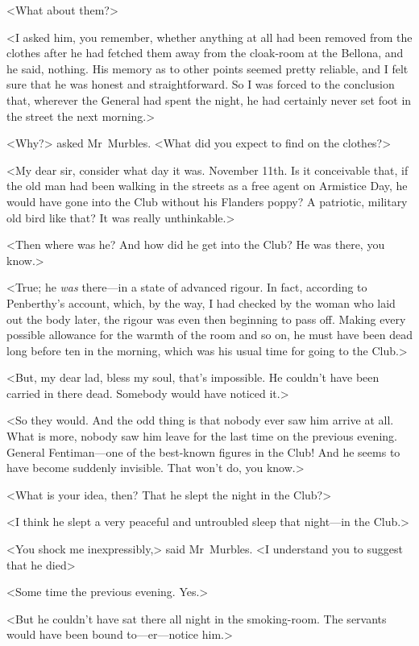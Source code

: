 <What about them?>

<I asked him, you remember, whether anything at all had been removed from the clothes after he had fetched them away from the cloak-room at the Bellona, and he said, nothing. His memory as to other points seemed pretty reliable, and I felt sure that he was honest and straightforward. So I was forced to the conclusion that, wherever the General had spent the night, he had certainly never set foot in the street the next morning.>

<Why?> asked Mr~Murbles. <What did you expect to find on the clothes?>

<My dear sir, consider what day it was. November 11th. Is it conceivable that, if the old man had been walking in the streets as a free agent on Armistice Day, he would have gone into the Club without his Flanders poppy? A patriotic, military old bird like that? It was really unthinkable.>

<Then where was he? And how did he get into the Club? He was there, you know.>

<True; he \emph{was} there—in a state of advanced rigour. In fact, according to Penberthy's account, which, by the way, I had checked by the woman who laid out the body later, the rigour was even then beginning to pass off. Making every possible allowance for the warmth of the room and so on, he must have been dead long before ten in the morning, which was his usual time for going to the Club.>

<But, my dear lad, bless my soul, that's impossible. He couldn't have been carried in there dead. Somebody would have noticed it.>

<So they would. And the odd thing is that nobody ever saw him arrive at all. What is more, nobody saw him leave for the last time on the previous evening. General Fentiman—one of the best-known figures in the Club! And he seems to have become suddenly invisible. That won't do, you know.>

<What is your idea, then? That he slept the night in the Club?>

<I think he slept a very peaceful and untroubled sleep that night—in the Club.>

<You shock me inexpressibly,> said Mr~Murbles. <I understand you to suggest that he died\longdash>

<Some time the previous evening. Yes.>

<But he couldn't have sat there all night in the smoking-room. The servants would have been bound to—er—notice him.>

